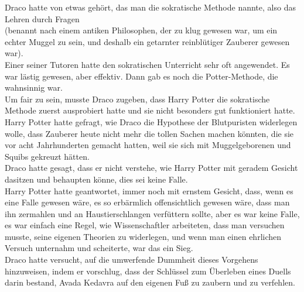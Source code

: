 {Draco hatte von etwas gehört, das man die sokratische Methode nannte, also das Lehren durch Fragen\\ (benannt nach einem antiken Philosophen, der zu klug gewesen war, um ein echter Muggel zu sein, und deshalb ein getarnter reinblütiger Zauberer gewesen war).\\ Einer seiner Tutoren hatte den sokratischen Unterricht sehr oft angewendet. Es war lästig gewesen, aber effektiv. Dann gab es noch die Potter-Methode, die wahnsinnig war.\\ Um fair zu sein, musste Draco zugeben, dass Harry Potter die sokratische Methode zuerst ausprobiert hatte und sie nicht besonders gut funktioniert hatte.\\ Harry Potter hatte gefragt, wie Draco die Hypothese der Blutpuristen widerlegen wolle, dass Zauberer heute nicht mehr die tollen Sachen machen könnten, die sie vor acht Jahrhunderten gemacht hatten, weil sie sich mit Muggelgeborenen und Squibs gekreuzt hätten.\\ Draco hatte gesagt, dass er nicht verstehe, wie Harry Potter mit geradem Gesicht dasitzen und behaupten könne, dies sei keine Falle.\\ Harry Potter hatte geantwortet, immer noch mit ernstem Gesicht, dass, wenn es eine Falle gewesen wäre, es so erbärmlich offensichtlich gewesen wäre, dass man ihn zermahlen und an Haustierschlangen verfüttern sollte, aber es war keine Falle, es war einfach eine Regel, wie Wissenschaftler arbeiteten, dass man versuchen musste, seine eigenen Theorien zu widerlegen, und wenn man einen ehrlichen Versuch unternahm und scheiterte, war das ein Sieg.\\ Draco hatte versucht, auf die umwerfende Dummheit dieses Vorgehens hinzuweisen, indem er vorschlug, dass der Schlüssel zum Überleben eines Duells darin bestand, Avada Kedavra auf den eigenen Fuß zu zaubern und zu verfehlen.

}
